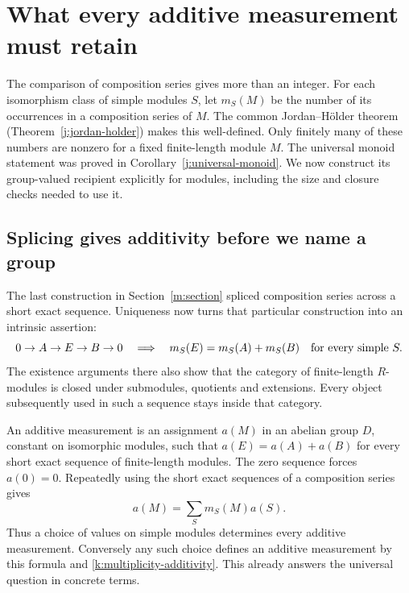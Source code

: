 \section{What every additive measurement must retain}
\label{k:section}

The comparison of composition series gives more than an integer.
For each isomorphism class of simple modules $S$, let $m_S(M)$ be
the number of its occurrences in a composition series of $M$.
The common Jordan--H\"older theorem (Theorem~\ref{j:jordan-holder})
makes this well-defined. Only finitely many of these numbers are
nonzero for a fixed finite-length module $M$. The universal monoid
statement was proved in Corollary~\ref{j:universal-monoid}. We now
construct its group-valued recipient explicitly for modules, including
the size and closure checks needed to use it.

\subsection{Splicing gives additivity before we name a group}

The last construction in Section~\ref{m:section} spliced composition
series across a short exact sequence. Uniqueness now turns that
particular construction into an intrinsic assertion:
\begin{equation}\label{k:multiplicity-additivity}
0\to A\to E\to B\to0
\quad\Longrightarrow\quad
m_S(E)=m_S(A)+m_S(B)\quad\hbox{for every simple }S.
\end{equation}
The existence arguments there also show that the category of
finite-length $R$-modules is closed under submodules, quotients and
extensions. Every object subsequently used in such a sequence stays
inside that category.

An additive measurement is an assignment $a(M)$ in an abelian group
$D$, constant on isomorphic modules, such that
$a(E)=a(A)+a(B)$ for every short exact sequence of finite-length
modules. The zero sequence forces $a(0)=0$. Repeatedly using the
short exact sequences of a composition series gives
\begin{equation}\label{k:all-measurements}
 a(M)=\sum_S m_S(M)a(S).
\end{equation}
Thus a choice of values on simple modules determines every additive
measurement. Conversely any such choice defines an additive measurement
by this formula and \eqref{k:multiplicity-additivity}. This already
answers the universal question in concrete terms.

